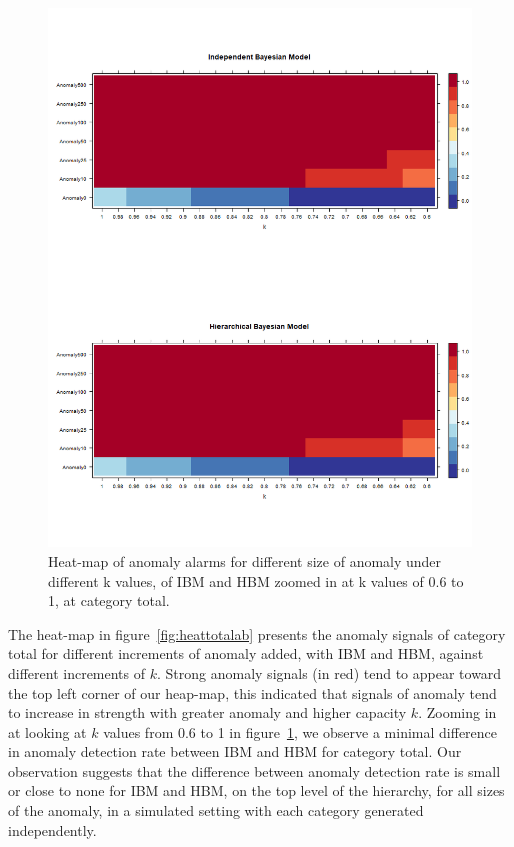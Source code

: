 \begin{figure}[!h]
	\centering
	\includegraphics[width=1\linewidth]{../../R-codes/JAGS/plots/sim1/heattotal2}
	\caption{Heat-map of anomaly alarms for different size of anomaly under different k values, of IBM and HBM zoomed in at k values of 0.6 to 1, at category total.}
	\label{fig:heattotalab2}
\end{figure}

\newpage

The heat-map in figure~\ref{fig:heattotalab} presents the anomaly signals of category total for different increments of anomaly added, with IBM and HBM, against different increments of $k$. Strong anomaly signals (in red) tend to appear toward the top left corner of our heap-map, this indicated that signals of anomaly tend to increase in strength with greater anomaly and higher capacity $k$. Zooming in at looking at $k$ values from 0.6 to 1 in figure~\ref{fig:heattotalab2}, we observe a minimal difference in anomaly detection rate between IBM and HBM for category total. Our observation suggests that the difference between anomaly detection rate is small or close to none for IBM and HBM, on the top level of the hierarchy, for all sizes of the anomaly, in a simulated setting with each category generated independently. 

